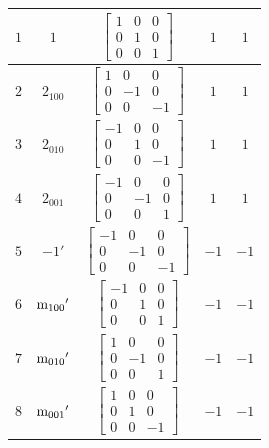 \documentclass[fleqn,8pt]{jsarticle}
\begin{document}
\begin{longtable}{ccccc}
$ 1 $ & $ 1 $ & $ \begin{bmatrix} 1 & 0 & 0 \\ 0 & 1 & 0 \\ 0 & 0 & 1 \end{bmatrix} $ & $ 1 $ & $ 1 $ \\ \hline
$ 2 $ & $ 2{}_{100} $ & $ \begin{bmatrix} 1 & 0 & 0 \\ 0 & -1 & 0 \\ 0 & 0 & -1 \end{bmatrix} $ & $ 1 $ & $ 1 $ \\ \hline
$ 3 $ & $ 2{}_{010} $ & $ \begin{bmatrix} -1 & 0 & 0 \\ 0 & 1 & 0 \\ 0 & 0 & -1 \end{bmatrix} $ & $ 1 $ & $ 1 $ \\ \hline
$ 4 $ & $ 2{}_{001} $ & $ \begin{bmatrix} -1 & 0 & 0 \\ 0 & -1 & 0 \\ 0 & 0 & 1 \end{bmatrix} $ & $ 1 $ & $ 1 $ \\ \hline
$ 5 $ & $ -1{}' $ & $ \begin{bmatrix} -1 & 0 & 0 \\ 0 & -1 & 0 \\ 0 & 0 & -1 \end{bmatrix} $ & $ -1 $ & $ -1 $ \\ \hline
$ 6 $ & $ {\rm m}_{100}{}' $ & $ \begin{bmatrix} -1 & 0 & 0 \\ 0 & 1 & 0 \\ 0 & 0 & 1 \end{bmatrix} $ & $ -1 $ & $ -1 $ \\ \hline
$ 7 $ & $ {\rm m}_{010}{}' $ & $ \begin{bmatrix} 1 & 0 & 0 \\ 0 & -1 & 0 \\ 0 & 0 & 1 \end{bmatrix} $ & $ -1 $ & $ -1 $ \\ \hline
$ 8 $ & $ {\rm m}_{001}{}' $ & $ \begin{bmatrix} 1 & 0 & 0 \\ 0 & 1 & 0 \\ 0 & 0 & -1 \end{bmatrix} $ & $ -1 $ & $ -1 $ \\
\end{longtable}
\end{document}
